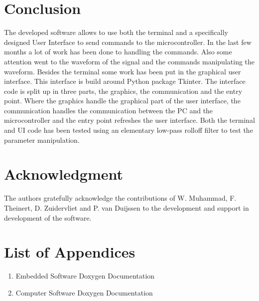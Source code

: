 \documentclass[conference]{IEEEtran}
\begin{document}


\section{Conclusion}
The developed software allows to use both the terminal and a specifically designed User Interface to send commands to the microcontroller. In the last few months a lot of work has been done to handling the commands. Also some attention went to the waveform of the signal and the commands manipulating the waveform. Besides the terminal some work has been put in the graphical user interface. This interface is build around Python package Tkinter. The interface code is split up in three parts, the graphics, the communication and the entry point. Where the graphics handle the graphical part of the user interface, the communication handles the communication between the PC and the microcontroller and the entry point refreshes the user interface. Both the terminal and UI code has been tested using an elementary low-pass rolloff filter to test the parameter manipulation.

\section*{Acknowledgment}
The authors gratefully acknowledge the contributions of W. Muhammad, F. Theinert, D. Zuidervliet and P. van Duijssen to the development and support in development of the software.

\section{List of Appendices}
\begin{enumerate}
\item	Embedded Software Doxygen Documentation
\item	Computer Software Doxygen Documentation
\end{enumerate}
\end{document}
